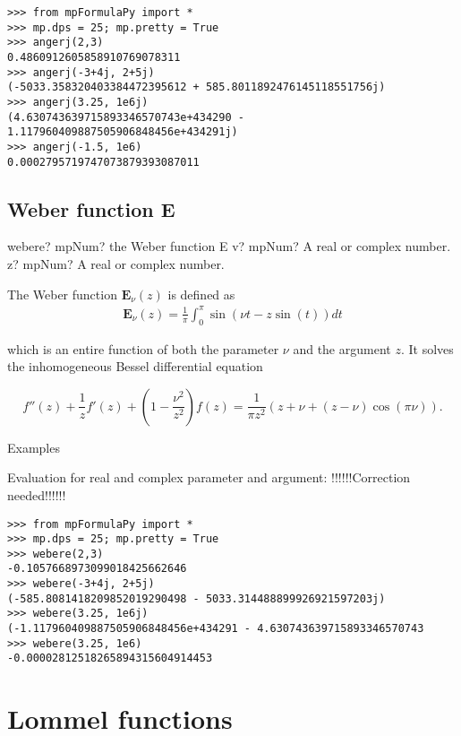 \begin{lstlisting}
>>> from mpFormulaPy import *
>>> mp.dps = 25; mp.pretty = True
>>> angerj(2,3)
0.4860912605858910769078311
>>> angerj(-3+4j, 2+5j)
(-5033.358320403384472395612 + 585.8011892476145118551756j)
>>> angerj(3.25, 1e6j)
(4.630743639715893346570743e+434290 - 1.117960409887505906848456e+434291j)
>>> angerj(-1.5, 1e6)
0.0002795719747073879393087011
\end{lstlisting}



\subsection{Weber function E}

\begin{mpFunctionsExtract}
	\mpFunctionTwo
	{webere? mpNum? the Weber function E}
	{v? mpNum? A real or complex number.}
	{z? mpNum? A real or complex number.}	
\end{mpFunctionsExtract}

\vpara
The Weber function $\textbf{E}_{\nu}(z)$ is defined as
\begin{eqnarray}
\textbf{E}_{\nu}(z) = \frac{1}{\pi} \int_0^{\pi} \sin(\nu t - z \sin(t)) dt
\end{eqnarray}

which is an entire function of both the parameter $\nu$ and the argument $z$. It solves the inhomogeneous Bessel differential equation

\begin{equation}
f''(z)+\frac{1}{z} f'(z) + \left(1-\frac{\nu^2}{z^2} \right)f(z) = \frac{1}{\pi z^2} (z+\nu+(z-\nu) \cos(\pi\nu)).
\end{equation}


Examples

Evaluation for real and complex parameter and argument:
!!!!!!Correction needed!!!!!!

\begin{lstlisting}
>>> from mpFormulaPy import *
>>> mp.dps = 25; mp.pretty = True
>>> webere(2,3)
-0.1057668973099018425662646
>>> webere(-3+4j, 2+5j)
(-585.8081418209852019290498 - 5033.314488899926921597203j)
>>> webere(3.25, 1e6j)
(-1.117960409887505906848456e+434291 - 4.630743639715893346570743
>>> webere(3.25, 1e6)
-0.00002812518265894315604914453
\end{lstlisting}


\newpage
\section{Lommel functions}


